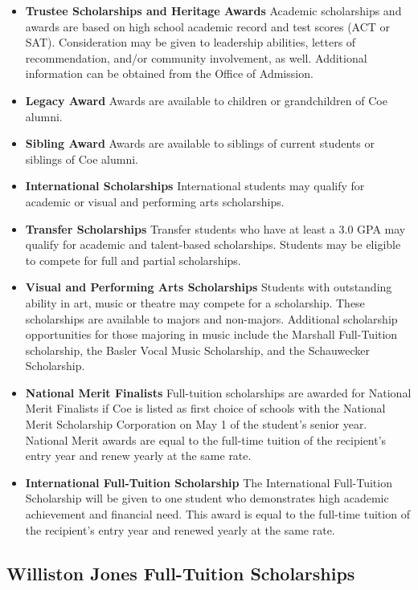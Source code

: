 \documentclass[
  letterpaper,
]{scrbook}
\providecommand{\tightlist}{%
  \setlength{\itemsep}{0pt}\setlength{\parskip}{0pt}}
\begin{document}
\begin{itemize}
\tightlist
\item
  \textbf{Trustee Scholarships and Heritage Awards} Academic
  scholarships and awards are based on high school academic record and
  test scores (ACT or SAT). Consideration may be given to leadership
  abilities, letters of recommendation, and/or community involvement, as
  well. Additional information can be obtained from the Office of
  Admission.
\item
  \textbf{Legacy Award} Awards are available to children or
  grandchildren of Coe alumni.
\item
  \textbf{Sibling Award} Awards are available to siblings of current
  students or siblings of Coe alumni.
\item
  \textbf{International Scholarships} International students may qualify
  for academic or visual and performing arts scholarships.
\item
  \textbf{Transfer Scholarships} Transfer students who have at least a
  3.0 GPA may qualify for academic and talent-based scholarships.
  Students may be eligible to compete for full and partial scholarships.
\item
  \textbf{Visual and Performing Arts Scholarships} Students with
  outstanding ability in art, music or theatre may compete for a
  scholarship. These scholarships are available to majors and
  non-majors. Additional scholarship opportunities for those majoring in
  music include the Marshall Full-Tuition scholarship, the Basler Vocal
  Music Scholarship, and the Schauwecker Scholarship.
\item
  \textbf{National Merit Finalists} Full-tuition scholarships are
  awarded for National Merit Finalists if Coe is listed as first choice
  of schools with the National Merit Scholarship Corporation on May 1 of
  the student's senior year. National Merit awards are equal to the
  full-time tuition of the recipient's entry year and renew yearly at
  the same rate.
\item
  \textbf{International Full-Tuition Scholarship} The International
  Full-Tuition Scholarship will be given to one student who demonstrates
  high academic achievement and financial need. This award is equal to
  the full-time tuition of the recipient's entry year and renewed yearly
  at the same rate.
\end{itemize}

\hypertarget{williston-jones-full-tuition-scholarships}{%
\subsection{Williston Jones Full-Tuition
Scholarships}\label{williston-jones-full-tuition-scholarships}}
\end{document}
